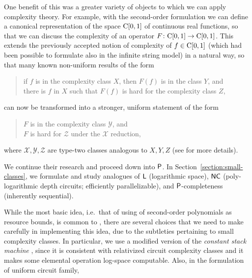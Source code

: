 \documentclass[envcountsame,orivec,oribibl]{llncs}
\begin{document}
One benefit of this was
a greater variety of objects to which we can apply complexity theory. 
For example, with the second-order formulation
we can define a canonical representation of the space $\mathrm C [0, 1]$
of continuous real functions, 
so that we can discuss the complexity of an
operator $F \colon \mathrm C [0, 1] \to \mathrm C [0, 1]$. 
This extends the previously accepted notion of 
complexity of $f \in \mathrm C [0, 1]$
(which had been possible to formulate also in the infinite string model)
in a natural way, so that many known non-uniform results of the form
\begin{quote}
 if $f$ is in the complexity class $X$,
 then $F(f)$ is in the class $Y$, and \\
 there is $f$ in $X$ such that $F(f)$ is hard for
 the complexity class $Z$, 
\end{quote}
can now be transformed into a stronger, uniform statement of the form
\begin{quote}
 $F$ is in the complexity class $\mathcal Y$, and \\
 $F$ is hard for $\mathcal Z$ under the $\mathcal X$ reduction,
\end{quote}
where $\mathcal{X, Y, Z}$ are type-two classes analogous to ${X, Y, Z}$ 
(see \cite{kawamura2012complexity} for more details).

We continue their research and proceed down into $\mathsf{P}$. 
In Section~\ref{section:small-classes}, 
we formulate and study analogues of 
$\mathsf{L}$ (logarithmic space), 
$\mathsf{NC}$ (poly-logarithmic depth circuits; efficiently parallelizable), 
and 
$\mathsf{P}$-completeness (inherently sequential). 

While the most basic idea, 
i.e.\ that of using of second-order polynomials as resource bounds, 
is common to \cite{kawamura2012complexity}, 
there are several choices that we need to make carefully
in implementing this idea, 
due to the subtleties pertaining to small complexity classes. 
In particular, 
we use a modified version of 
the \emph{constant stack machine} \cite{aehlig2007relativizing}, 
since it is consistent with relativized circuit complexity classes 
and it makes some elemental operation log-space computable.
Also, in the formulation of uniform circuit family, 
\end{document}
